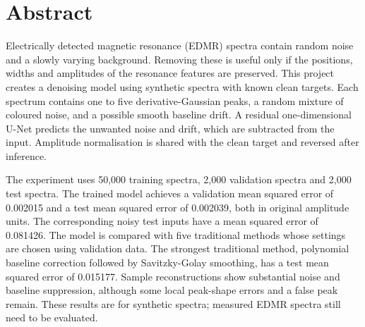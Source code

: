 \documentclass[a4paper,11pt,oneside]{report}
\begin{document}
\hypersetup{pageanchor=false}

\hypersetup{pageanchor=true}
\chapter*{Abstract}
Electrically detected magnetic resonance (EDMR) spectra contain random noise and a slowly varying background. Removing these is useful only if the positions, widths and amplitudes of the resonance features are preserved. This project creates a denoising model using synthetic spectra with known clean targets. Each spectrum contains one to five derivative-Gaussian peaks, a random mixture of coloured noise, and a possible smooth baseline drift. A residual one-dimensional U-Net predicts the unwanted noise and drift, which are subtracted from the input. Amplitude normalisation is shared with the clean target and reversed after inference.

The experiment uses 50,000 training spectra, 2,000 validation spectra and 2,000 test spectra. The trained model achieves a validation mean squared error of 0.002015 and a test mean squared error of 0.002039, both in original amplitude units. The corresponding noisy test inputs have a mean squared error of 0.081426. The model is compared with five traditional methods whose settings are chosen using validation data. The strongest traditional method, polynomial baseline correction followed by Savitzky-Golay smoothing, has a test mean squared error of 0.015177. Sample reconstructions show substantial noise and baseline suppression, although some local peak-shape errors and a false peak remain. These results are for synthetic spectra; measured EDMR spectra still need to be evaluated.
\tableofcontents
\clearpage
{}

\clearpage
{}


\end{document}
